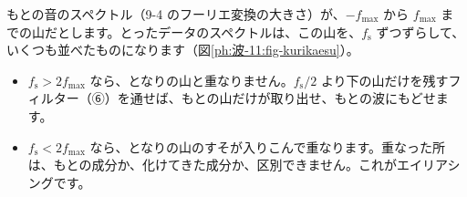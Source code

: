 もとの音のスペクトル（9-4 のフーリエ変換の大きさ）が、$-f_{\max}$ から $f_{\max}$ までの山だとします。とったデータのスペクトルは、この山を、$f_{\mathrm s}$ ずつずらして、いくつも並べたものになります（図\ref{ph:波-11:fig-kurikaesu}）。
\begin{itemize}[leftmargin=1.2\zw, itemsep=1pt, topsep=2pt, label={\color{bkTheme}●}]
\item $f_{\mathrm s}>2f_{\max}$ なら、となりの山と重なりません。$f_{\mathrm s}/2$ より下の山だけを残すフィルター（⑥）を通せば、もとの山だけが取り出せ、もとの波にもどせます。
\item $f_{\mathrm s}<2f_{\max}$ なら、となりの山のすそが入りこんで重なります。重なった所は、もとの成分か、化けてきた成分か、区別できません。これがエイリアシングです。
\end{itemize}

